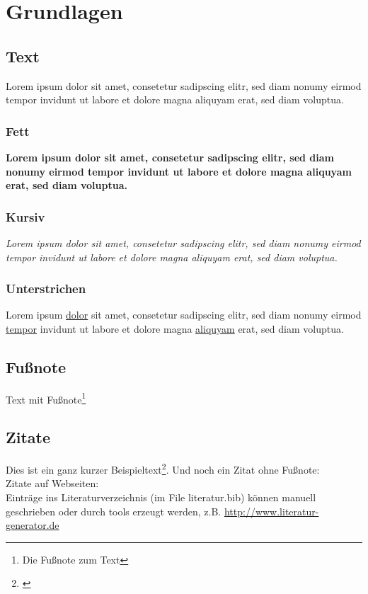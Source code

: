 \chapter{Grundlagen}
\section{Text}
Lorem ipsum dolor sit amet, consetetur sadipscing elitr, sed diam nonumy eirmod tempor invidunt ut labore et dolore magna aliquyam erat, sed diam voluptua.

\subsection{Fett}
\textbf{Lorem ipsum dolor sit amet, consetetur sadipscing elitr, sed diam nonumy eirmod tempor invidunt ut labore et dolore magna aliquyam erat, sed diam voluptua.}

\subsection{Kursiv}
\textit{Lorem ipsum dolor sit amet, consetetur sadipscing elitr, sed diam nonumy eirmod tempor invidunt ut labore et dolore magna aliquyam erat, sed diam voluptua.}

\subsection{Unterstrichen}
Lorem ipsum \underline{dolor} sit amet, consetetur sadipscing elitr, sed diam nonumy eirmod \underline{tempor} invidunt ut labore et dolore magna \underline{aliquyam} erat, sed diam voluptua.

\section{Fußnote}

Text mit Fußnote\footnote{Die Fußnote zum Text}

\section{Zitate}

Dies ist ein ganz kurzer Beispieltext\footnote{\cite{Richter2016}}. Und noch ein Zitat ohne Fußnote:~\cite{Jacobsen2017}
\\
Zitate auf Webseiten:~\cite{PlutoRed}
\\
Einträge ins Literaturverzeichnis (im File literatur.bib) können manuell geschrieben oder durch tools erzeugt werden, z.B. \url{http://www.literatur-generator.de}

